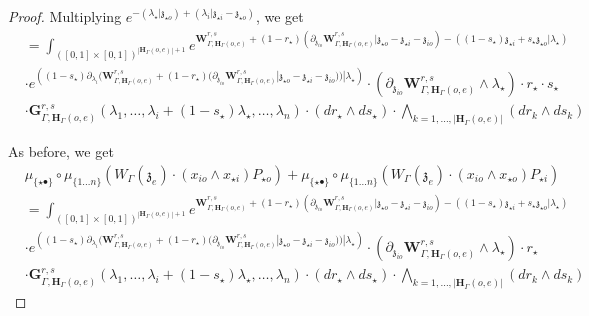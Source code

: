 \documentclass[11pt]{amsart}
\theoremstyle{definition}
\theoremstyle{remark}
\numberwithin{equation}{section}
\begin{document}
\begin{proof}
Multiplying $e^{-(\lambda_{\star}|\mathfrak{z}_{\star o})+(\lambda_i|\mathfrak{z}_{\star i}-\mathfrak{z}_{\star o})}$, we get
\begin{align*}
&  = \int_{([0,1]\times[0,1])^{|\mathbf{H}_{\Gamma}(o,e)|+1}} e^{\mathbf{W}^{r,s}_{\Gamma,\mathbf{H}_{\Gamma}(o,e)}+(1-r_{\star})\left(\partial_{\mathfrak{z}_{io}}\mathbf{W}^{r,s}_{\Gamma,\mathbf{H}_{\Gamma}(o,e)}|\mathfrak{z}_{\star o}-\mathfrak{z}_{\star i}-\mathfrak{z}_{io}\right)-\left((1-s_{\star})\mathfrak{z}_{\star i}+s_{\star}\mathfrak{z}_{\star o}|\lambda_{\star}\right)} \\
   & \cdot e^{\left((1-s_{\star})\partial_{\lambda_i}(\mathbf{W}^{r,s}_{\Gamma,\mathbf{H}_{\Gamma}(o,e)}+(1-r_{\star})(\partial_{\mathfrak{z}_{io}}\mathbf{W}^{r,s}_{\Gamma,\mathbf{H}_{\Gamma}(o,e)}|\mathfrak{z}_{\star o}-\mathfrak{z}_{\star i}-\mathfrak{z}_{io}))|\lambda_{\star}\right)}\cdot \left(\partial_{\mathfrak{z}_{io}}\mathbf{W}^{r,s}_{\Gamma,\mathbf{H}_{\Gamma}(o,e)}\wedge\lambda_{\star}\right)\cdot r_{\star}\cdot s_{\star}\\
   &\cdot  \mathbf{G}^{r,s}_{\Gamma,\mathbf{H}_{\Gamma}(o,e)}(\lambda_1,\dots,\lambda_i+(1-s_{\star})\lambda_{\star},\dots,\lambda_{n})\cdot (dr_{\star}\wedge ds_{\star})\cdot \bigwedge_{k=1,\dots,|\mathbf{H}_{\Gamma}(o,e)|} (dr_k\wedge ds_k)
\end{align*}

As before, we get
\begin{align*}
   &   \mu_{\{\star\bullet\}}\circ \mu_{\{1\dots n\}}\left(W_{\Gamma}(\mathfrak{z}_{e})\cdot (x_{io}\wedge x_{\star i})P_{\star o }\right) +  \mu_{\{\star\bullet\}}\circ \mu_{\{1\dots n\}}\left(W_{\Gamma}(\mathfrak{z}_{e})\cdot (x_{io}\wedge x_{\star o})P_{\star i }\right) \\
 &  = \int_{([0,1]\times[0,1])^{|\mathbf{H}_{\Gamma}(o,e)|+1}} e^{\mathbf{W}^{r,s}_{\Gamma,\mathbf{H}_{\Gamma}(o,e)}+(1-r_{\star})\left(\partial_{\mathfrak{z}_{io}}\mathbf{W}^{r,s}_{\Gamma,\mathbf{H}_{\Gamma}(o,e)}|\mathfrak{z}_{\star o}-\mathfrak{z}_{\star i}-\mathfrak{z}_{io}\right)-\left((1-s_{\star})\mathfrak{z}_{\star i}+s_{\star}\mathfrak{z}_{\star o}|\lambda_{\star}\right)} \\
   & \cdot e^{\left((1-s_{\star})\partial_{\lambda_i}(\mathbf{W}^{r,s}_{\Gamma,\mathbf{H}_{\Gamma}(o,e)}+(1-r_{\star})(\partial_{\mathfrak{z}_{io}}\mathbf{W}^{r,s}_{\Gamma,\mathbf{H}_{\Gamma}(o,e)}|\mathfrak{z}_{\star o}-\mathfrak{z}_{\star i}-\mathfrak{z}_{io}))|\lambda_{\star}\right)}\cdot \left(\partial_{\mathfrak{z}_{io}}\mathbf{W}^{r,s}_{\Gamma,\mathbf{H}_{\Gamma}(o,e)}\wedge\lambda_{\star}\right)\cdot r_{\star}\\
   &\cdot  \mathbf{G}^{r,s}_{\Gamma,\mathbf{H}_{\Gamma}(o,e)}(\lambda_1,\dots,\lambda_i+(1-s_{\star})\lambda_{\star},\dots,\lambda_{n})\cdot (dr_{\star}\wedge ds_{\star})\cdot \bigwedge_{k=1,\dots,|\mathbf{H}_{\Gamma}(o,e)|} (dr_k\wedge ds_k)
\end{align*}

  \end{proof}
\end{document}
